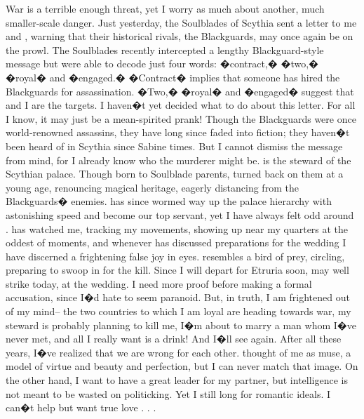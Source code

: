 \documentclass[char]{Kos}
\begin{document}
War is a terrible enough threat, yet I worry as much about another, much smaller-scale danger. Just yesterday, the Soulblades of Scythia sent a letter to me and \cGroom{\nickname}, warning that their historical rivals, the Blackguards, may once again be on the prowl. The Soulblades recently intercepted a lengthy Blackguard-style message but were able to decode just four words: �contract,� �two,� �royal� and �engaged.� �Contract� implies that someone has hired the Blackguards for assassination. �Two,� �royal� and �engaged� suggest that \cGroom{\nickname} and I are the targets.
I haven�t yet decided what to do about this letter. For all I know, it may just be a mean-spirited prank! Though the Blackguards were once world-renowned assassins, they have long since faded into fiction; they haven�t been heard of in Scythia since Sabine times. But I cannot dismiss the message from mind, for I already know who the murderer might be.
 is the steward of the Scythian palace. Though born to Soulblade parents,  turned  back on them at a young age, renouncing  magical heritage, eagerly distancing  from the Blackguards� enemies.  has since wormed  way up the palace hierarchy with astonishing speed and become our top servant, yet I have always felt odd around .  has watched me, tracking my movements, showing up near my quarters at the oddest of moments, and whenever  has discussed preparations for the wedding I have discerned a frightening false joy in  eyes.  resembles a bird of prey, circling, preparing to swoop in for the kill. Since I will depart for Etruria soon,  may well strike today, at the wedding.
I need more proof before making a formal accusation, since I�d hate to seem paranoid. But, in truth, I am frightened out of my mind-- the two countries to which I am loyal are heading towards war, my steward is probably planning to kill me, I�m about to marry a man whom I�ve never met, and all I really want is a drink!
And I�ll see \cPoet{\nickname} again. After all these years, I�ve realized that we are wrong for each other. \cPoet{\They} thought of me as \cPoet{\their} muse, a model of virtue and beauty and perfection, but I can never match that image. On the other hand, I want to have a great leader for my partner, but \cPoet{\their} intelligence is not meant to be wasted on politicking. Yet I still long for \cPoet{\their} romantic ideals. I can�t help but want true love . . .
\end{document}
